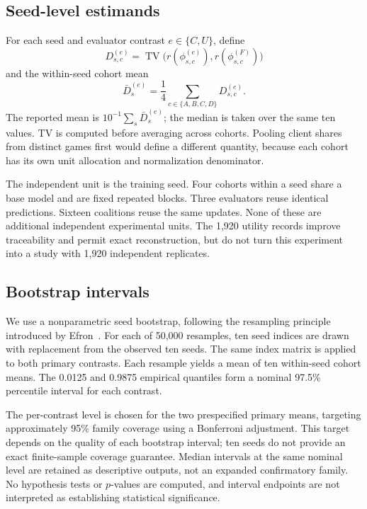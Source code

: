\documentclass[conference,letterpaper]{IEEEtran}
\newcommand{\TV}{\operatorname{TV}}
\begin{document}
\subsection{Seed-level estimands}
For each seed and evaluator contrast $e\in\{C,U\}$, define
\begin{equation}
D_{s,c}^{(e)}=\TV\big(r(\phi_{s,c}^{(e)}),r(\phi_{s,c}^{(F)})\big)
\end{equation}
and the within-seed cohort mean
\begin{equation}
\bar D_s^{(e)}=\frac{1}{4}\sum_{c\in\{A,B,C,D\}}D_{s,c}^{(e)}.
\label{eq:seedmean}
\end{equation}
The reported mean is $10^{-1}\sum_s\bar D_s^{(e)}$; the median is taken over the same ten values. TV is computed before averaging across cohorts. Pooling client shares from distinct games first would define a different quantity, because each cohort has its own unit allocation and normalization denominator.

The independent unit is the training seed. Four cohorts within a seed share a base model and are fixed repeated blocks. Three evaluators reuse identical predictions. Sixteen coalitions reuse the same updates. None of these are additional independent experimental units. The 1,920 utility records improve traceability and permit exact reconstruction, but do not turn this experiment into a study with 1,920 independent replicates.

\subsection{Bootstrap intervals}
We use a nonparametric seed bootstrap, following the resampling principle introduced by Efron~\cite{efron}. For each of 50,000 resamples, ten seed indices are drawn with replacement from the observed ten seeds. The same index matrix is applied to both primary contrasts. Each resample yields a mean of ten within-seed cohort means. The 0.0125 and 0.9875 empirical quantiles form a nominal 97.5\% percentile interval for each contrast.

The per-contrast level is chosen for the two prespecified primary means, targeting approximately 95\% family coverage using a Bonferroni adjustment. This target depends on the quality of each bootstrap interval; ten seeds do not provide an exact finite-sample coverage guarantee. Median intervals at the same nominal level are retained as descriptive outputs, not an expanded confirmatory family. No hypothesis tests or $p$-values are computed, and interval endpoints are not interpreted as establishing statistical significance.
\end{document}
